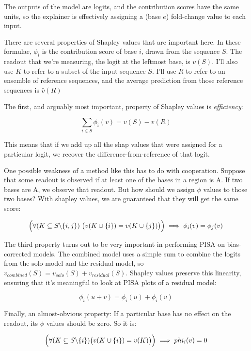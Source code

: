 \documentclass{article}
\begin{document}
The outputs of the model are logits, and the contribution scores have the same units, so the
explainer is effectively assigning a (base $e$) fold-change value to each input.

There are several properties of Shapley values that are important here.
In these formulae, $\phi_i$ is the contribution score of base $i$, drawn from the sequence $S$.
The readout that we're measuring, the logit at the leftmost base, is $v(S)$.
I'll also use $K$ to refer to a subset of the input sequence $S$.
I'll use $R$ to refer to an ensemble of reference sequences, and the average prediction from those
reference sequences is $\bar{v}(R)$

The first, and arguably most important, property of Shapley values is \emph{efficiency}:

\begin{equation}
    \sum_{i \in S} \phi_i(v) = v(S) - \bar{v}(R)
\end{equation}

This means that if we add up all the shap values that were assigned for a particular logit, we
recover the difference-from-reference of that logit.

One possible weakness of a method like this has to do with cooperation. Suppose that some readout
is observed if at least one of the bases in a region is A. If two bases are A, we observe that
readout. But how should we assign $\phi$ values to those two bases?
With shapley values, we are guaranteed that they will get the same score:

\begin{equation}
    \Bigl( \forall (K \subseteq S \backslash \{i,j\})\;
    \bigl(v(K \cup \{i\}) = v(K \cup \{j\})\bigr) \Bigr)
    \\
    \implies \phi_i(v) = \phi_j(v)
\end{equation}

The third property turns out to be very important in performing PISA on bias-corrected models.
The combined model uses a simple sum to combine the logits from the solo model and the residual
model, so $v_{combined}(S) = v_{solo}(S) + v_{residual}(S)$.
Shapley values preserve this linearity, ensuring that it's meaningful to look at PISA plots of
a residual model:

\begin{equation}
    \phi_i(u + v) = \phi_i(u) + \phi_i(v)
\end{equation}

Finally, an almost-obvious property: If a particular base has no effect on the readout, its $\phi$
values should be zero. So it is:

\begin{equation}
    \Bigl( \forall (K \subseteq S \backslash \{i\})
    \bigl( v(K \cup \{i\}) = v(K)\bigr)\Bigr)
    \\
    \implies phi_i(v) = 0
\end{equation}
\end{document}
